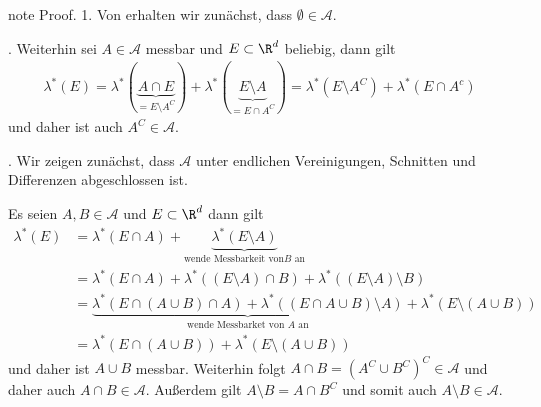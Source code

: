 \documentclass[letterpaper,10pt,english]{jupyterBook}
\begin{document}
\begin{sphinxadmonition}{note}
\sphinxAtStartPar
Proof. 1. Von {\hyperref[\detokenize{masstheorie/masstheorie:thm:lebesguemes}]{}} erhalten wir zunächst, dass \(\emptyset\in\mathcal{A}\).

. Weiterhin sei \(A\in\mathcal{A}\) messbar und \(E\subset\R^d\) beliebig, dann gilt
\begin{equation*}
\begin{split}\lambda^\ast(E) = \lambda^\ast(\underbrace{A\cap E}_{=E\setminus A^C}) + \lambda^\ast(\underbrace{E\setminus A}_{=E\cap A^C}) = 
\lambda^\ast(E\setminus A^C) + \lambda^\ast(E\cap A^c) \end{split}
\end{equation*}
\sphinxAtStartPar
und daher ist auch \(A^C\in\mathcal{A}\).

. Wir zeigen zunächst, dass \(\mathcal{A}\) unter endlichen Vereinigungen, Schnitten und Differenzen abgeschlossen ist.

\sphinxAtStartPar
Es seien \(A,B\in\mathcal{A}\) und \(E\subset\R^d\) dann gilt
\begin{equation*}
\begin{split}\lambda^\ast(E) &= \lambda^\ast(E\cap A) + \underbrace{\lambda^\ast(E\setminus A)}_{\text{wende Messbarkeit von} B\text{ an}}\\
&=\lambda^\ast(E\cap A) + \lambda^\ast((E\setminus A)\cap B) + \lambda^\ast((E\setminus A)\setminus B)\\
&=
\underbrace{\lambda^\ast(E\cap (A\cup B)\cap A) + \lambda^\ast((E\cap A\cup B)\setminus A)}_{\text{wende Messbarket von } A \text{ an}} + \lambda^\ast(E\setminus(A\cup B))\\
&=
\lambda^\ast(E\cap (A\cup B)) + \lambda^\ast(E\setminus(A\cup B))\end{split}
\end{equation*}
\sphinxAtStartPar
und daher ist \(A\cup B\) messbar. Weiterhin folgt \(A\cap B = (A^C\cup B^C)^C\in\mathcal{A}\) und daher auch \(A\cap B\in\mathcal{A}\). Außerdem gilt \(A\setminus B = A\cap B^C\) und somit auch \(A\setminus B\in\mathcal{A}\).


\end{sphinxadmonition}
\end{document}
